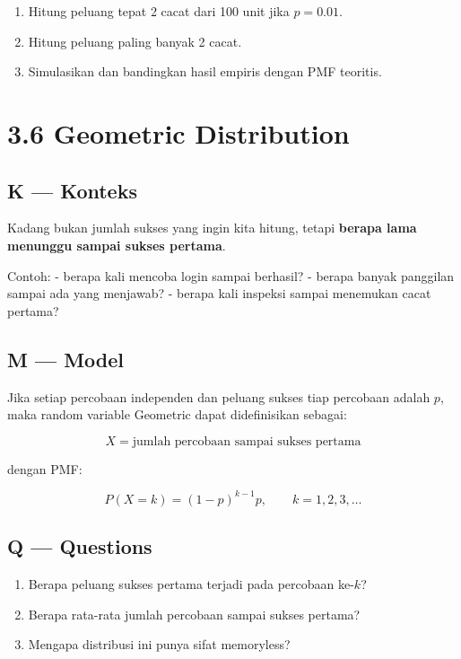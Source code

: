 \documentclass[
  letterpaper,
  DIV=11,
  numbers=noendperiod]{scrreprt}
\providecommand{\tightlist}{%
  \setlength{\itemsep}{0pt}\setlength{\parskip}{0pt}}
\begin{document}
\begin{enumerate}
\def\labelenumi{\arabic{enumi}.}
\tightlist
\item
  Hitung peluang tepat 2 cacat dari 100 unit jika \(p=0.01\).
\item
  Hitung peluang paling banyak 2 cacat.
\item
  Simulasikan dan bandingkan hasil empiris dengan PMF teoritis.
\end{enumerate}

\section{3.6 Geometric Distribution}\label{geometric-distribution}

\subsection{K --- Konteks}\label{k-konteks-14}

Kadang bukan jumlah sukses yang ingin kita hitung, tetapi \textbf{berapa
lama menunggu sampai sukses pertama}.

Contoh: - berapa kali mencoba login sampai berhasil? - berapa banyak
panggilan sampai ada yang menjawab? - berapa kali inspeksi sampai
menemukan cacat pertama?

\subsection{M --- Model}\label{m-model-14}

Jika setiap percobaan independen dan peluang sukses tiap percobaan
adalah \(p\), maka random variable Geometric dapat didefinisikan
sebagai:

\[
X = \text{jumlah percobaan sampai sukses pertama}
\]

dengan PMF:

\[
P(X=k)=(1-p)^{k-1}p, \qquad k=1,2,3,\dots
\]

\subsection{Q --- Questions}\label{q-questions-14}

\begin{enumerate}
\def\labelenumi{\arabic{enumi}.}
\tightlist
\item
  Berapa peluang sukses pertama terjadi pada percobaan ke-\(k\)?
\item
  Berapa rata-rata jumlah percobaan sampai sukses pertama?
\item
  Mengapa distribusi ini punya sifat memoryless?
\end{enumerate}
\end{document}
